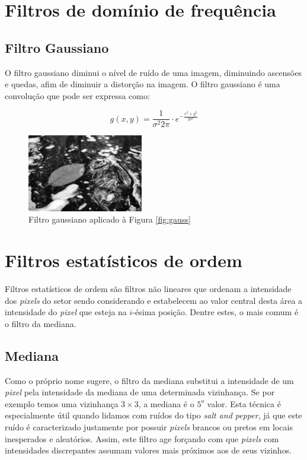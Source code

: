\documentclass[10pt,a4paper]{article}
\newcommand{\pixel}{\textit{pixel} }
\newcommand{\pixels}{\textit{pixels} }
\begin{document}
\section{Filtros de domínio de frequência}
\subsection{Filtro Gaussiano}
O filtro gaussiano diminui o nível de ruído de uma imagem, diminuindo ascensões e quedas, afim de diminuir a distorção na imagem. O filtro gaussiano é uma convolução que pode ser expressa como:

\begin{equation}
g(x,y) = \frac{1}{\sigma^{2} 2 \pi} \cdot e^{-\frac{x^2 + y^2}{2 \sigma^{2}}}
\end{equation}

\begin{figure}[!ht]
    \centering
    \includegraphics[width=0.45\textwidth]{dst_sp_median.jpg}
    \caption{Filtro gaussiano aplicado à Figura \ref{fig:gauss}}
    \label{fig:gauss_filter}
\end{figure}

\section{Filtros estatísticos de ordem}
Filtros estatísticos de ordem são filtros não lineares que ordenam a intensidade dos \pixels do setor sendo considerando e estabelecem ao valor central desta área a intensidade do \pixel que esteja na $i$-ésima posição. Dentre estes, o mais comum é o filtro da mediana.

\subsection{Mediana}
Como o próprio nome sugere, o filtro da mediana substitui a intensidade de um \pixel pela intensidade da mediana de uma determinada vizinhança. Se por exemplo temos uma vizinhança $3\times3$, a mediana é o $5^o$ valor. Esta técnica é especialmente útil quando lidamos com ruídos do tipo \textit{salt and pepper}, já que este ruído é caracterizado justamente por possuir \pixels brancos ou pretos em locais inesperados e aleatórios. Assim, este filtro age forçando com que \pixels com intensidades discrepantes assumam valores mais próximos aos de seus vizinhos.
\end{document}
